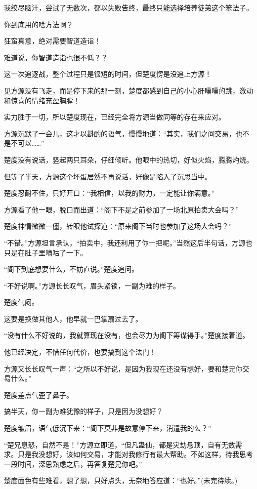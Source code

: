 \begin{this_body}
我绞尽脑汁，尝试了无数次，都以失败告终，最终只能选择培养徒弟这个笨法子。

你到底用的啥方法啊？

狂蛮真意，绝对需要智道造诣！

难道说，你智道造诣也很不低？？

这一次追逐战，整个过程只是很短的时间，但楚度愣是没追上方源！

见方源没有飞走，而是停下来的那一刻，楚度都感到自己的小心肝噗噗的跳，激动和惊喜的情绪充盈胸膛！

实力胜于一切，所以楚度现在，已经完全将方源当做同等的存在来应对。

方源沉默了一会儿，这才以斟酌的语气，慢慢地道：“其实，我们之间交易，也不是不可以……”

楚度没有说话，竖起两只耳朵，仔细倾听。他眼中的热切，好似火焰，腾腾灼烧。

但等了半天，方源这个坏蛋居然不再说话，好像是陷入了沉思当中。

楚度忍耐不住，只好开口：“我相信，以我的财力，一定能让你满意。”

方源看了他一眼，脱口而出道：“阁下不是之前参加了一场北原拍卖大会吗？”

楚度神情微微一僵，转眼他试探道：“原来阁下当时也参加了这场大会吗？”

“不错。”方源坦言承认，“拍卖中，我还利用了你一把呢。”当然这后半句话，方源也只是在肚子里嘀咕了一下。

“阁下到底想要什么，不妨直说。”楚度追问。

“不好说啊。”方源长长叹气，眉头紧锁，一副为难的样子。

楚度气闷。

这要是换做其他人，他早就一巴掌扇过去了。

“没有什么不好说的，我就算现在没有，也会尽力为阁下筹谋得手。”楚度接着道。

他已经决定，不惜任何代价，也要搞到这个法门！

方源又长长叹气一声：“之所以不好说，是因为我现在还没有想好，要和楚兄你交易什么。”

楚度差点气歪了鼻子。

搞半天，你一副为难犹豫的样子，只是因为没想好？

楚度皱眉，语气低沉下来：“阁下莫非是故意停下来，消遣我的么？”

“楚兄息怒，自然不是！”方源立即道，“但凡蛊仙，都是灾劫悬顶，自有无数需求。只是我没想好，该如何交易，才能对我修行有最大帮助。不如这样，待我思考一段时间，深思熟虑之后，再答复楚兄你吧。”

楚度面色有些难看，想了想，只好点头，无奈地答应道：“也好。”(未完待续。)

\end{this_body}

